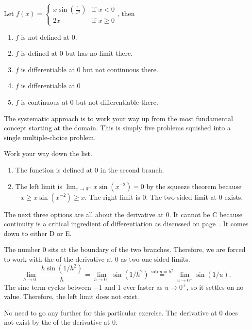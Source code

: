 \documentclass[../main.tex]{subfiles}
\begin{document}
\begin{exercise} \label{ex:midterm-practice-11}
  Let \(f(x) = \begin{cases} x \sin\left(\frac{1}{x^{2}}\right) &\text{if } x < 0 \\ 2x &\text{if } x \ge 0\end{cases}\), then
  \begin{enumerate}[label=\Alph*.]
    \item \(f\) is not defined at \(0\).
    \item \(f\) is defined at \(0\) but has no limit there.
    \item \(f\) is differentiable at \(0\) but not continuous there.
    \item \(f\) is differentiable at \(0\)
    \item \(f\) is continuous at \(0\) but not differentiable there.
  \end{enumerate}

  \begin{hint}
    The systematic approach is to work your way up from the most fundamental concept starting at the domain. This is simply five problems squished into a single multiple-choice problem.
  \end{hint}
  \begin{solution}
    Work your way down the list.
    \begin{enumerate}[label=\Alph*.]
      \item The function is defined at \(0\) in the second branch.
      \item The left limit is \(\lim_{x \to 0^{-}} x \sin(x^{-2}) = 0\) by the squeeze theorem because \(-x \ge x \sin(x^{-2}) \ge x\).  The right limit is \(0\). The two-sided limit at \(0\) exists.
    \end{enumerate}


    The next three options are all about the derivative at \(0\). It cannot be C because continuity is a critical ingredient of differentiation as discussed on page~\pageref{thm:differentiability-implies-continuity}.  It comes down to either D or E.

    The number \(0\) sits at the boundary of the two branches. Therefore, we are forced to work with the  of the derivative at \(0\) as two one-sided limits.
    \[
      \lim_{h \to 0^{-}} \frac{h\sin(1/h^{2})}{h} = \lim_{h \to 0^{-}} \sin(1/h^{2}) \overset{\text{sub } u = h^{2}}{=} \lim_{u \to 0^{+}} \sin(1/u).
    \]
    The sine term cycles between \(-1\) and \(1\) ever faster as \(u \to 0^{+}\), so it settles on no value. Therefore, the left limit does not exist.

    No need to go any further for this particular exercise. The derivative at \(0\) does not exist by the  of the derivative at \(0\).
  \end{solution}
\end{exercise}
\vfill
\clearpage
\end{document}
